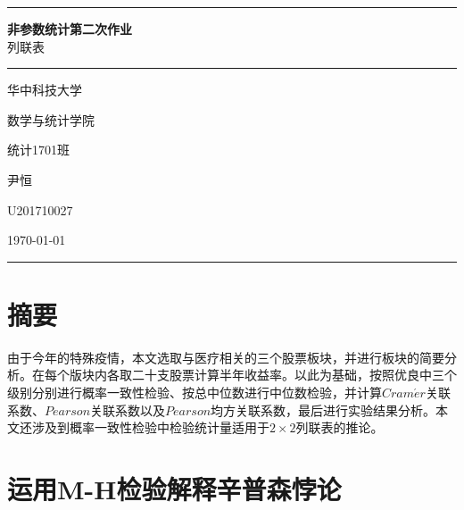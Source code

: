 \documentclass[a4paper, 11pt]{article}
\begin{document}
\begin{titlepage}
	\centering
	\rule{\textwidth}{1pt}   %
	\vspace{0.025\textheight}  %
	
	{\Huge \textbf{非参数统计第二次作业}}\\
	{\Large 列联表}
	
	
	\vspace{0.025\textheight}   %
	\rule{0.83\textwidth}{0.4pt}  %
	\vspace{0.1\textheight}  %
	
	{\Large \textsc{华中科技大学}}
	
	{\Large \textsc{数学与统计学院}}
	
	{\Large \textsc{统计1701班}}
	
	{\Large \textsc{尹恒}}
	
	{\Large \textsc{U201710027}}
	
	\vfill  %
	
	{\large \today}
	\vspace{0.1\textheight}  %
	
	
	\rule{\textwidth}{1pt}  %
\end{titlepage}

\tableofcontents

\newpage

\section{摘要}
由于今年的特殊疫情，本文选取与医疗相关的三个股票板块，并进行板块的简要分析。在每个版块内各取二十支股票计算半年收益率。以此为基础，按照优良中三个级别分别进行概率一致性检验、按总中位数进行中位数检验，并计算$ Cram\acute{e}r $关联系数、$ Pearson $关联系数以及$ Pearson $均方关联系数，最后进行实验结果分析。本文还涉及到概率一致性检验中检验统计量适用于$ 2\times 2 $列联表的推论。
\section{运用M-H检验解释辛普森悖论}
\end{document}
